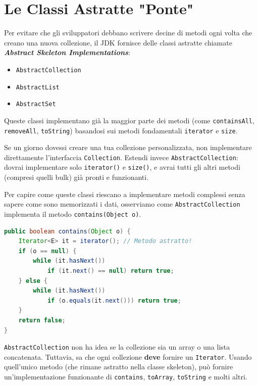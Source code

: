 \section{Le Classi Astratte "Ponte"}

Per evitare che gli sviluppatori debbano scrivere decine di metodi ogni volta che creano una nuova collezione, il JDK fornisce delle classi astratte chiamate \textbf{\textit{Abstract Skeleton Implementations}}:
\begin{itemize}
    \item \texttt{AbstractCollection}
    \item \texttt{AbstractList}
    \item \texttt{AbstractSet}
\end{itemize}

Queste classi implementano già la maggior parte dei metodi (come \texttt{containsAll}, \texttt{removeAll}, \texttt{toString}) basandosi sui metodi fondamentali \texttt{iterator} e \texttt{size}.

\begin{tip}
Se un giorno dovessi creare una tua collezione personalizzata, non implementare direttamente l'interfaccia \texttt{Collection}. Estendi invece \texttt{AbstractCollection}: dovrai implementare solo \texttt{iterator()} e \texttt{size()}, e avrai tutti gli altri metodi (compresi quelli bulk) già pronti e funzionanti.
\end{tip}

Per capire come queste classi riescano a implementare metodi complessi senza sapere come sono memorizzati i dati, osserviamo come \texttt{AbstractCollection} implementa il metodo \texttt{contains(Object o)}.

\begin{lstlisting}[language=Java, caption={Logica di AbstractCollection.contains}]
public boolean contains(Object o) {
    Iterator<E> it = iterator(); // Metodo astratto!
    if (o == null) {
        while (it.hasNext())
            if (it.next() == null) return true;
    } else {
        while (it.hasNext())
            if (o.equals(it.next())) return true;
    }
    return false;
}
\end{lstlisting}

\begin{observation}
\texttt{AbstractCollection} non ha idea se la collezione sia un array o una lista concatenata. Tuttavia, sa che ogni collezione \textbf{deve} fornire un \texttt{Iterator}. Usando quell'unico metodo (che rimane astratto nella classe skeleton), può fornire un'implementazione funzionante di \texttt{contains}, \texttt{toArray}, \texttt{toString} e molti altri.
\end{observation}

